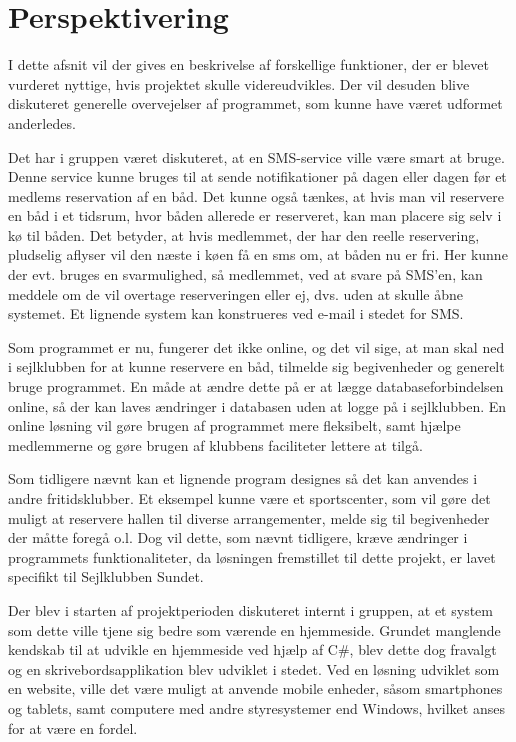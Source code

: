 \chapter{Perspektivering}

I dette afsnit vil der gives en beskrivelse af forskellige funktioner, der er blevet vurderet nyttige, hvis projektet skulle videreudvikles. 
Der vil desuden blive diskuteret generelle overvejelser af programmet, som kunne have været udformet anderledes. 

Det har i gruppen været diskuteret, at en SMS-service ville være smart at bruge. 
Denne service kunne bruges til at sende notifikationer på dagen eller dagen før et medlems reservation af en båd.
Det kunne også tænkes, at hvis man vil reservere en båd i et tidsrum, hvor båden allerede er reserveret, kan man placere sig selv i kø til båden.
Det betyder, at hvis medlemmet, der har den reelle reservering, pludselig aflyser vil den næste i køen få en sms om, at båden nu er fri.
Her kunne der evt. bruges en svarmulighed, så medlemmet, ved at svare på SMS'en, kan meddele om de vil overtage reserveringen eller ej, dvs. uden at skulle åbne systemet.
Et lignende system kan konstrueres ved e-mail i stedet for SMS.

Som programmet er nu, fungerer det ikke online, og det vil sige, at man skal ned i sejlklubben for at kunne reservere en båd, tilmelde sig begivenheder og generelt bruge programmet. 
En måde at ændre dette på er at lægge databaseforbindelsen online, så der kan laves ændringer i databasen uden at logge på i sejlklubben. 
En online løsning vil gøre brugen af programmet mere fleksibelt, samt hjælpe medlemmerne og gøre brugen af klubbens faciliteter lettere at tilgå.

Som tidligere nævnt kan et lignende program designes så det kan anvendes i andre fritidsklubber.
Et eksempel kunne være et sportscenter, som vil gøre det muligt at reservere hallen til diverse arrangementer, melde sig til begivenheder der måtte foregå o.l. 
Dog vil dette, som nævnt tidligere, kræve ændringer i programmets funktionaliteter, da løsningen fremstillet til dette projekt, er lavet specifikt til Sejlklubben Sundet.

Der blev i starten af projektperioden diskuteret internt i gruppen, at et system som dette ville tjene sig bedre som værende en hjemmeside.
Grundet manglende kendskab til at udvikle en hjemmeside ved hjælp af C\#, blev dette dog fravalgt og en skrivebordsapplikation blev udviklet i stedet. 
Ved en løsning udviklet som en website, ville det være muligt at anvende mobile enheder, såsom smartphones og tablets, samt computere med andre styresystemer end Windows, hvilket anses for at være en fordel. 

